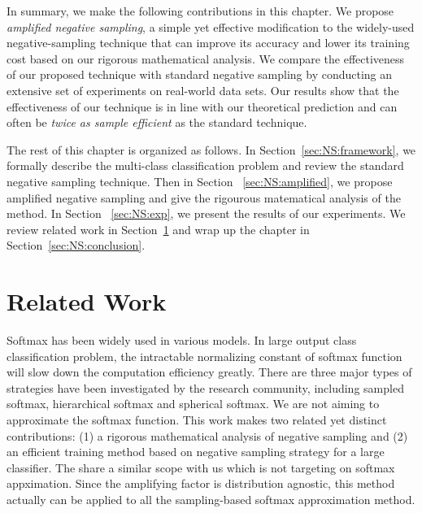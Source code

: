 In summary, we make the following contributions in this chapter.
We propose \emph{amplified negative sampling}, a simple yet effective modification to the widely-used negative-sampling technique that can improve its accuracy and lower its training cost based on our rigorous mathematical analysis.
 We compare the effectiveness of our proposed technique with standard negative sampling by conducting an extensive set of experiments on real-world data sets. Our results show that the effectiveness of our technique is in line with our theoretical prediction and can often be \emph{twice as sample efficient} as the standard technique. 


The rest of this chapter is organized as follows. In Section~\ref{sec:NS:framework}, 
we formally describe the multi-class classification problem and review the standard negative sampling technique. Then in Section ~\ref{sec:NS:amplified}, 
we propose amplified negative sampling and give the rigourous matematical analysis of the method. In Section ~\ref{sec:NS:exp}, 
we present the results of our experiments. We review related work in Section~\ref{sec:NS:related} 
and wrap up the chapter in Section~\ref{sec:NS:conclusion}.

\section{Related Work}
\label{sec:NS:related}
Softmax has been widely used in various models. In large output class classification problem, the intractable normalizing constant of softmax function will slow down the computation efficiency greatly. There are three major types of strategies have been investigated by the research community, including sampled softmax\citep{bengio2008adaptive}, hierarchical softmax\citep{morin2005hierarchical} and spherical softmax\citep{vincent2015efficient}.
We are not aiming to approximate the softmax function. This work makes two related yet distinct contributions: (1) a rigorous mathematical analysis of negative sampling and (2) an efficient training method based on negative sampling strategy for a large classifier.  The \citep{ruiz2018augment} share a similar scope with us which is not targeting on softmax appximation. Since the amplifying factor is distribution agnostic, this method actually can be applied to all the sampling-based softmax approximation method\citep{blanc2017adaptive,rawat2019sampled}.


